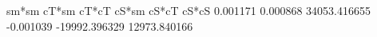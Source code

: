                                    sm*sm               cT*sm               cT*cT               cS*sm               cS*cT               cS*cS
                                0.001171            0.000868        34053.416655           -0.001039       -19992.396329        12973.840166